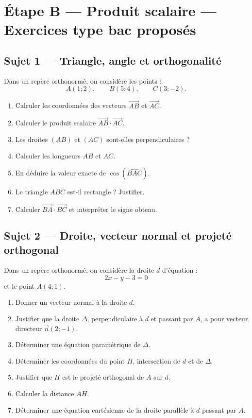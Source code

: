 \section*{Étape B — Produit scalaire — Exercices type bac proposés}

\subsection*{Sujet 1 — Triangle, angle et orthogonalité}

Dans un repère orthonormé, on considère les points :
\[
A(1;2),\qquad B(5;4),\qquad C(3;-2).
\]
\begin{enumerate}
\item Calculer les coordonnées des vecteurs $\overrightarrow{AB}$ et $\overrightarrow{AC}$.
\item Calculer le produit scalaire $\overrightarrow{AB}\cdot\overrightarrow{AC}$.
\item Les droites $(AB)$ et $(AC)$ sont-elles perpendiculaires ?
\item Calculer les longueurs $AB$ et $AC$.
\item En déduire la valeur exacte de $\cos(\widehat{BAC})$.
\item Le triangle $ABC$ est-il rectangle ? Justifier.
\item Calculer $\overrightarrow{BA}\cdot\overrightarrow{BC}$ et interpréter le signe obtenu.
\end{enumerate}

\subsection*{Sujet 2 — Droite, vecteur normal et projeté orthogonal}

Dans un repère orthonormé, on considère la droite $d$ d'équation :
\[
2x-y-3=0
\]
et le point $A(4;1)$.
\begin{enumerate}
\item Donner un vecteur normal à la droite $d$.
\item Justifier que la droite $\Delta$, perpendiculaire à $d$ et passant par $A$, a pour vecteur directeur $\vec n(2;-1)$.
\item Déterminer une équation paramétrique de $\Delta$.
\item Déterminer les coordonnées du point $H$, intersection de $d$ et de $\Delta$.
\item Justifier que $H$ est le projeté orthogonal de $A$ sur $d$.
\item Calculer la distance $AH$.
\item Déterminer une équation cartésienne de la droite parallèle à $d$ passant par $A$.
\end{enumerate}

